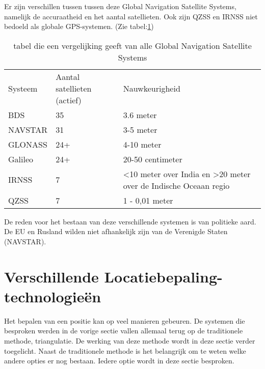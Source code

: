 Er zijn verschillen tussen tussen deze Global Navigation Satellite Systems, namelijk de accuraatheid en het aantal satellieten. Ook zijn QZSS en IRNSS niet bedoeld als globale GPS-systemen. (Zie tabel:\ref{tab:GNSS-vergelijking})
\begin{table}[]
	\begin{tabular}{lll}
		Systeem & Aantal satellieten (actief) & Nauwkeurigheid                                                                        \\
				BDS     & 35                          & 3.6 meter                                                                      \\
		NAVSTAR & 31                          & 3-5 meter                                                                             \\
		GLONASS & 24+                         & 4-10 meter                                                                            \\
		Galileo & 24+                         & 20-50 centimeter                                                                      \\
		IRNSS   & 7                           & \textless 10 meter over India en \textgreater{}20 meter over de Indische Oceaan regio \\
		QZSS    & 7                           & 1 - 0,01 meter                                                                       
	\end{tabular}
\label{tab:GNSS-vergelijking}
\caption{tabel die een vergelijking geeft van alle Global Navigation Satellite Systems}
\autocite{gnss}
\end{table}
\newline
De reden voor het bestaan van deze verschillende systemen is van politieke aard. De EU en Rusland wilden niet afhankelijk zijn van de Verenigde Staten (NAVSTAR).

\section{Verschillende Locatiebepaling-technologieën}
\label{sec:Locatiebepaling-technologieën}
Het bepalen van een positie kan op veel manieren gebeuren. De systemen die besproken werden in de vorige sectie vallen allemaal terug op de traditionele methode, triangulatie. De werking van deze methode wordt in deze sectie verder toegelicht. Naast de traditionele methode is het belangrijk om te weten welke andere opties er nog bestaan. Iedere optie wordt in deze sectie besproken.
